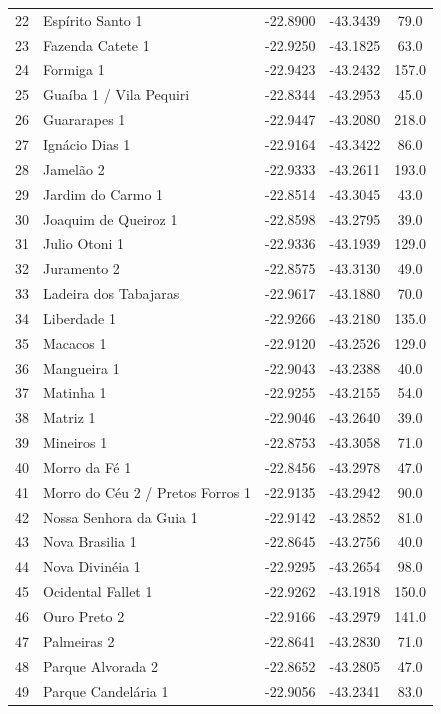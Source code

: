 \begin{longtable}{clccc}
22 & Espírito Santo 1 & -22.8900 & -43.3439 & 79.0 \\
23 & Fazenda Catete 1 & -22.9250 & -43.1825 & 63.0 \\
24 & Formiga 1 & -22.9423 & -43.2432 & 157.0 \\
25 & Guaíba 1 / Vila Pequiri & -22.8344 & -43.2953 & 45.0 \\
26 & Guararapes 1 & -22.9447 & -43.2080 & 218.0 \\
27 & Ignácio Dias 1 & -22.9164 & -43.3422 & 86.0 \\
28 & Jamelão 2 & -22.9333 & -43.2611 & 193.0 \\
29 & Jardim do Carmo 1 & -22.8514 & -43.3045 & 43.0 \\
30 & Joaquim de Queiroz 1 & -22.8598 & -43.2795 & 39.0 \\
31 & Julio Otoni 1 & -22.9336 & -43.1939 & 129.0 \\
32 & Juramento 2 & -22.8575 & -43.3130 & 49.0 \\
33 & Ladeira dos Tabajaras & -22.9617 & -43.1880 & 70.0 \\
34 & Liberdade 1 & -22.9266 & -43.2180 & 135.0 \\
35 & Macacos 1 & -22.9120 & -43.2526 & 129.0 \\
36 & Mangueira 1 & -22.9043 & -43.2388 & 40.0 \\
37 & Matinha 1 & -22.9255 & -43.2155 & 54.0 \\
38 & Matriz 1 & -22.9046 & -43.2640 & 39.0 \\
39 & Mineiros 1 & -22.8753 & -43.3058 & 71.0 \\
40 & Morro da Fé 1 & -22.8456 & -43.2978 & 47.0 \\
41 & Morro do Céu 2 / Pretos Forros 1 & -22.9135 & -43.2942 & 90.0 \\
42 & Nossa Senhora da Guia 1 & -22.9142 & -43.2852 & 81.0 \\
43 & Nova Brasilia 1 & -22.8645 & -43.2756 & 40.0 \\
44 & Nova Divinéia 1 & -22.9295 & -43.2654 & 98.0 \\
45 & Ocidental Fallet 1 & -22.9262 & -43.1918 & 150.0 \\
46 & Ouro Preto 2 & -22.9166 & -43.2979 & 141.0 \\
47 & Palmeiras 2 & -22.8641 & -43.2830 & 71.0 \\
48 & Parque Alvorada 2 & -22.8652 & -43.2805 & 47.0 \\
49 & Parque Candelária 1 & -22.9056 & -43.2341 & 83.0 \\

\end{longtable}
